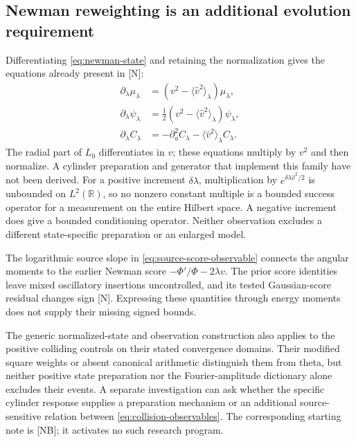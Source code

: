 \documentclass[11pt,letterpaper]{article}
\numberwithin{equation}{section}
\theoremstyle{remark}
\newcommand{\R}{\mathbb R}
\newcommand{\evid}[1]{\textsf{[#1]}}
\begin{document}
\subsection{Newman reweighting is an additional evolution requirement}

Differentiating \eqref{eq:newman-state} and retaining the normalization
gives the equations already present in \evid{N}:
\begin{equation}
 \begin{aligned}
 \partial_\lambda\mu_\lambda
   &=(v^2-\langle\widehat v^2\rangle_\lambda)\mu_\lambda,\\
 \partial_\lambda\psi_\lambda
   &=\tfrac12(v^2-\langle\widehat v^2\rangle_\lambda)\psi_\lambda,\\
 \partial_\lambda C_\lambda
   &=-\partial_a^2C_\lambda
     -\langle\widehat v^2\rangle_\lambda C_\lambda.
 \end{aligned}
 \label{eq:normalized-newman-flow}
\end{equation}
The radial part of \(L_0\) differentiates in \(v\); these equations
multiply by \(v^2\) and then normalize. A cylinder preparation and
generator that implement this family have not been derived.
For a positive increment \(\delta\lambda\), multiplication by
\(e^{\delta\lambda\widehat v^2/2}\) is unbounded on \(L^2(\R)\),
so no nonzero constant multiple is a bounded success operator for
a measurement on the entire Hilbert space. A negative increment
does give a bounded conditioning operator. Neither observation
excludes a different state-specific preparation or an enlarged model.

The logarithmic source slope in \eqref{eq:source-score-observable}
connects the angular moments to the earlier Newman score
\(-\Phi'/\Phi-2\lambda v\). The prior score identities leave
mixed oscillatory insertions uncontrolled, and its tested
Gaussian-score residual changes sign \evid{N}. Expressing these
quantities through energy moments does not supply their missing
signed bounds.

The generic normalized-state and observation construction also applies
to the positive colliding controls on their stated convergence domains.
Their modified square weights or absent canonical arithmetic distinguish
them from theta, but neither positive state preparation nor the
Fourier-amplitude dictionary alone excludes their events. A separate
investigation can ask whether the specific cylinder response supplies
a preparation mechanism or an additional source-sensitive relation
between \eqref{eq:collision-observables}. The corresponding starting
note is \evid{NB}; it activates no such research program.
\end{document}
